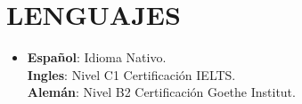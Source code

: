 \documentclass[a4paper,11pt]{article}
\begin{document}
	\section{LENGUAJES}
	\begin{itemize}[leftmargin=0in,label={}]
		\item \small{
			\textbf{Español}: Idioma Nativo. \\
			\textbf{Ingles}: Nivel C1 Certificación IELTS. \\
			\textbf{Alemán}: Nivel B2 Certificación Goethe Institut.
		}
	\end{itemize}
	
\end{document}
